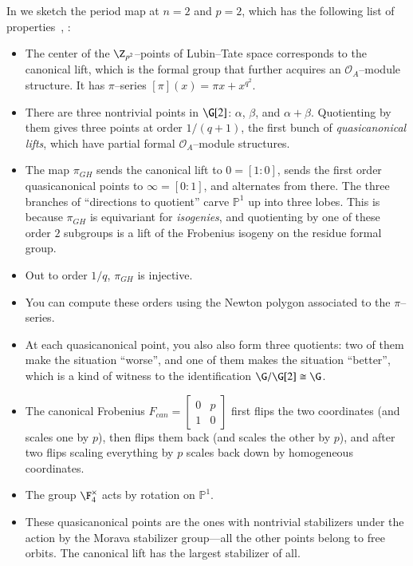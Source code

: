 \begin{remark}
In  we sketch the period map at $n = 2$ and $p = 2$, which has the following list of properties~\cite[Appendix 25]{HopkinsGrossEquivVBs}, \cite{Yu}:
\begin{itemize}
\item The center of the $\Z_{p^2}$--points of Lubin--Tate space corresponds to the canonical lift, which is the formal group that further acquires an $\mathcal O_A$--module structure.  It has $\pi$--series $[\pi](x) = \pi x + x^{q^2}$.
\item There are three nontrivial points in $\G[2]$: $\alpha$, $\beta$, and $\alpha + \beta$.  Quotienting by them gives three points at order $1/(q+1)$, the first bunch of \textit{quasicanonical lifts}, which have partial formal $\mathcal O_A$--module structures.
\item The map $\pi_{GH}$ sends the canonical lift to $0 = [1:0]$, sends the first order quasicanonical points to $\infty = [0:1]$, and alternates from there.  The three branches of ``directions to quotient'' carve $\mathbb P^1$ up into three lobes.  This is because $\pi_{GH}$ is equivariant for \textit{isogenies}, and quotienting by one of these order $2$ subgroups is a lift of the Frobenius isogeny on the residue formal group.
\item Out to order $1/q$, $\pi_{GH}$ is injective.
\item You can compute these orders using the Newton polygon associated to the $\pi$--series.
\item At each quasicanonical point, you also also form three quotients: two of them make the situation ``worse'', and one of them makes the situation ``better'', which is a kind of witness to the identification $\G / \G[2] \cong \G$.
\item The canonical Frobenius $F_{can} = \left[ \begin{array}{cc} 0 & p \\ 1 & 0 \end{array} \right]$ first flips the two coordinates (and scales one by $p$), then flips them back (and scales the other by $p$), and after two flips scaling everything by $p$ scales back down by homogeneous coordinates.
\item The group $\F_4^\times$ acts by rotation on $\mathbb P^1$.
\item These quasicanonical points are the ones with nontrivial stabilizers under the action by the Morava stabilizer group---all the other points belong to free orbits.  The canonical lift has the largest stabilizer of all.
\end{itemize}
\end{remark}

